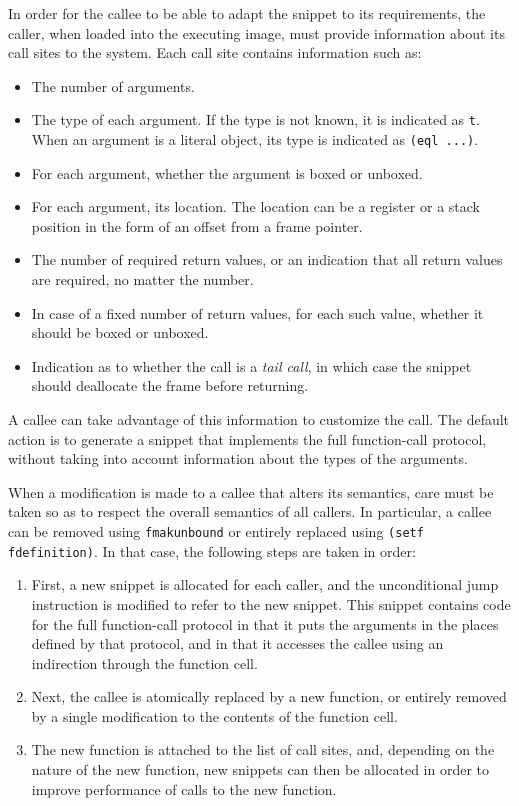 In order for the callee to be able to adapt the snippet to its
requirements, the caller, when loaded into the executing image, must
provide information about its call sites to the system.  Each call
site contains information such as:

\begin{itemize}
\item The number of arguments.
\item The type of each argument.  If the type is not known, it is
  indicated as \texttt{t}.  When an argument is a literal object, its
  type is indicated as \texttt{(eql ...)}.
\item For each argument, whether the argument is boxed or unboxed.
\item For each argument, its location.  The location can be a register
  or a stack position in the form of an offset from a frame pointer.
\item The number of required return values, or an indication that all
  return values are required, no matter the number.
\item In case of a fixed number of return values, for each such value,
  whether it should be boxed or unboxed.
\item Indication as to whether the call is a \emph{tail call}, in
  which case the snippet should deallocate the frame before
  returning.
\end{itemize}

A callee can take advantage of this information to customize the
call.  The default action is to generate a snippet that implements the
full function-call protocol, without taking into account information
about the types of the arguments.

When a modification is made to a callee that alters its semantics,
care must be taken so as to respect the overall semantics of all
callers.  In particular, a callee can be removed using
\texttt{fmakunbound} or entirely replaced using \texttt{(setf
  fdefinition)}.  In that case, the following steps are taken in
order:

\begin{enumerate}
\item First, a new snippet is allocated for each caller, and the
  unconditional jump instruction is modified to refer to the new
  snippet.  This snippet contains code for the full function-call
  protocol in that it puts the arguments in the places defined by that
  protocol, and in that it accesses the callee using an indirection
  through the function cell.
\item Next, the callee is atomically replaced by a new function, or
  entirely removed by a single modification to the contents of the
  function cell.
\item The new function is attached to the list of call sites, and,
  depending on the nature of the new function, new snippets can then
  be allocated in order to improve performance of calls to the new
  function.
\end{enumerate}
